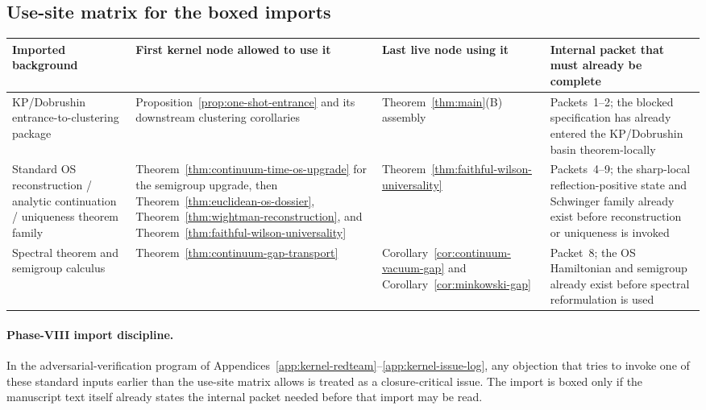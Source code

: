 \subsection*{Use-site matrix for the boxed imports}
\begin{center}
\small
\setlength{\tabcolsep}{4pt}
\renewcommand{\arraystretch}{1.08}
\begin{tabular}{@{}p{3.15cm}p{2.55cm}p{2.45cm}p{3.35cm}@{}}
\toprule
\textbf{Imported background} & \textbf{First kernel node allowed to use it} & \textbf{Last live node using it} & \textbf{Internal packet that must already be complete}\\
\midrule
KP/Dobrushin entrance-to-clustering package & Proposition~\ref{prop:one-shot-entrance} and its downstream clustering corollaries & Theorem~\ref{thm:main}(B) assembly & Packets~1--2; the blocked specification has already entered the KP/Dobrushin basin theorem-locally\\
Standard OS reconstruction / analytic continuation / uniqueness theorem family & Theorem~\ref{thm:continuum-time-os-upgrade} for the semigroup upgrade, then Theorem~\ref{thm:euclidean-os-dossier}, Theorem~\ref{thm:wightman-reconstruction}, and Theorem~\ref{thm:faithful-wilson-universality} & Theorem~\ref{thm:faithful-wilson-universality} & Packets~4--9; the sharp-local reflection-positive state and Schwinger family already exist before reconstruction or uniqueness is invoked\\
Spectral theorem and semigroup calculus & Theorem~\ref{thm:continuum-gap-transport} & Corollary~\ref{cor:continuum-vacuum-gap} and Corollary~\ref{cor:minkowski-gap} & Packet~8; the OS Hamiltonian and semigroup already exist before spectral reformulation is used\\
\bottomrule
\end{tabular}
\end{center}

\paragraph{Phase-VIII import discipline.}
In the adversarial-verification program of Appendices~\ref{app:kernel-redteam}--\ref{app:kernel-issue-log}, any objection that tries to invoke one of these standard inputs earlier than the use-site matrix allows is treated as a closure-critical issue. The import is boxed only if the manuscript text itself already states the internal packet needed before that import may be read.

